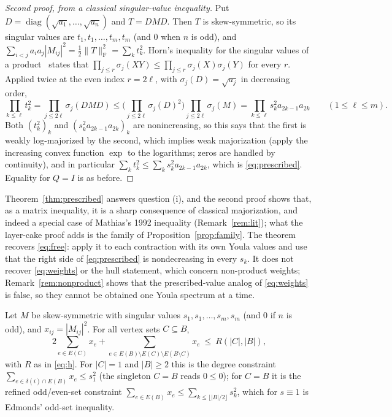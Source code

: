 \documentclass[11pt]{article}
\newcommand{\F}{\mathrm F}
\DeclareMathOperator{\diag}{diag}
\begin{document}
\begin{proof}[Second proof, from a classical singular-value inequality]
Put $D=\diag(\sqrt{a_1},\dots,\sqrt{a_n})$ and $T=DMD$. Then $T$ is
skew-symmetric, so its singular values are $t_1,t_1,\dots,t_m,t_m$ (and $0$
when $n$ is odd), and
$\sum_{i<j}a_ia_j|M_{ij}|^2=\tfrac12\|T\|_\F^2=\sum_kt_k^2$. Horn's
inequality for the singular values of a product~\cite{horn50} states that
$\prod_{j\le r}\sigma_j(XY)\le\prod_{j\le r}\sigma_j(X)\sigma_j(Y)$ for every
$r$. Applied twice at the even index $r=2\ell$, with $\sigma_j(D)=\sqrt{a_j}$
in decreasing order,
\[
\prod_{k\le\ell}t_k^2=\prod_{j\le2\ell}\sigma_j(DMD)
\le\Big(\prod_{j\le2\ell}\sigma_j(D)^2\Big)\prod_{j\le2\ell}\sigma_j(M)
=\prod_{k\le\ell}s_k^2a_{2k-1}a_{2k}\qquad(1\le\ell\le m).
\]
Both $(t_k^2)_k$ and $(s_k^2a_{2k-1}a_{2k})_k$ are nonincreasing, so this says
that the first is weakly log-majorized by the second, which implies weak
majorization (apply the increasing convex function $\exp$ to the logarithms;
zeros are handled by continuity), and in particular
$\sum_kt_k^2\le\sum_ks_k^2a_{2k-1}a_{2k}$, which is \eqref{eq:prescribed}.
Equality for $Q=I$ is as before.
\end{proof}

Theorem~\ref{thm:prescribed} answers question (i), and the second proof shows
that, as a matrix inequality, it is a sharp consequence of classical
majorization, and indeed a special case of Mathias's 1992 inequality
(Remark~\ref{rem:lit}); what the layer-cake proof adds is the family of
Proposition~\ref{prop:family}. The theorem recovers \eqref{eq:free}: apply it
to each contraction with its own Youla values and use that the right side of
\eqref{eq:prescribed} is nondecreasing in every $s_k$. It does not recover
\eqref{eq:weights} or the hull statement, which concern non-product weights;
Remark~\ref{rem:nonproduct} shows that the prescribed-value analog of
\eqref{eq:weights} is false, so they cannot be obtained one Youla spectrum at
a time.

\begin{proposition}\label{prop:family}
Let $M$ be skew-symmetric with singular values $s_1,s_1,\dots,s_m,s_m$ (and
$0$ if $n$ is odd), and $x_{ij}=|M_{ij}|^2$. For all vertex sets $C\subseteq B$,
\begin{equation}\label{eq:family}
2\sum_{e\in E(C)}x_e+\sum_{e\in E(B)\setminus E(C)\setminus E(B\setminus C)}x_e\ \le\ R(|C|,|B|),
\end{equation}
with $R$ as in \eqref{eq:h}. For $|C|=1$ and $|B|\ge2$ this is the degree constraint
$\sum_{e\in\delta(i)\cap E(B)}x_e\le s_1^2$ (the singleton $C=B$ reads $0\le0$); for $C=B$ it is the refined
odd/even-set constraint $\sum_{e\in E(B)}x_e\le\sum_{k\le\lfloor|B|/2\rfloor}s_k^2$,
which for $s\equiv1$ is Edmonds' odd-set inequality.
\end{proposition}
\end{document}
